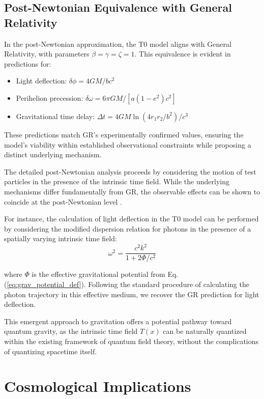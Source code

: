 \documentclass[12pt,a4paper]{article} %
\begin{document}
	\subsection{Post-Newtonian Equivalence with General Relativity}
	\label{subsec:post_newtonian}
	
	In the post-Newtonian approximation,
	the T0 model aligns with General Relativity,
	with parameters $\beta = \gamma = \zeta = 1$. 
	This equivalence is evident in predictions for:
	\begin{itemize}
		\item Light deflection: $\delta\phi = 4GM/bc^2$
		\item Perihelion precession: $\delta\omega = 6\pi GM/[a(1-e^2)c^2]$
		\item Gravitational time delay: $\Delta t = 4GM\ln(4r_1r_2/b^2)/c^3$
	\end{itemize}
	
	These predictions match GR's experimentally confirmed values,
	ensuring the model's viability within established observational constraints
	while proposing a distinct underlying mechanism.
	
	The detailed post-Newtonian analysis proceeds
	by considering the motion of test particles
	in the presence of the intrinsic time field. 
	While the underlying mechanisms differ fundamentally from GR,
	the observable effects can be shown to coincide at the post-Newtonian level \cite{Will2014}.
	
	For instance, the calculation of light deflection in the T0 model
	can be performed by considering the modified dispersion relation
	for photons in the presence of a spatially varying intrinsic time field:
	\begin{equation}
		\omega^2 = \frac{c^2k^2}{1 + 2\Phi/c^2}
		\label{eq:modified_dispersion}
	\end{equation}
	
	where $\Phi$ is the effective gravitational potential
	from Eq. (\ref{eq:grav_potential_def}). 
	Following the standard procedure of calculating the photon trajectory
	in this effective medium,
	we recover the GR prediction for light deflection.
	
	This emergent approach to gravitation
	offers a potential pathway toward quantum gravity,
	as the intrinsic time field $T(x)$ can be naturally quantized
	within the existing framework of quantum field theory,
	without the complications of quantizing spacetime itself.
	
	\section{Cosmological Implications}
	\label{sec:cosmological}
\end{document}
